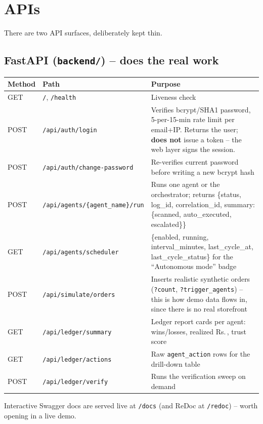 \documentclass[11pt,a4paper]{article}
\newcommand{\Rs}{Rs.\,}
\begin{document}
\section{APIs}

There are two API surfaces, deliberately kept thin.

\subsection{FastAPI (\texttt{backend/}) -- does the real work}
\begin{center}
\begin{tabular}{@{}p{1.2cm}p{4.6cm}p{6.8cm}@{}}
\toprule
\textbf{Method} & \textbf{Path} & \textbf{Purpose} \\
\midrule
GET & \texttt{/}, \texttt{/health} & Liveness check \\
POST & \texttt{/api/auth/login} & Verifies bcrypt/SHA1 password, 5-per-15-min rate limit per
email+IP. Returns the user; \textbf{does not} issue a token -- the web layer signs the session. \\
POST & \texttt{/api/auth/change-password} & Re-verifies current password before writing a new
bcrypt hash \\
POST & \texttt{/api/agents/\{agent\_name\}/run} & Runs one agent or the orchestrator; returns
\{status, log\_id, correlation\_id, summary: \{scanned, auto\_executed, escalated\}\} \\
GET & \texttt{/api/agents/scheduler} & \{enabled, running, interval\_minutes, last\_cycle\_at,
last\_cycle\_status\} for the ``Autonomous mode'' badge \\
POST & \texttt{/api/simulate/orders} & Inserts realistic synthetic orders (\texttt{?count},
\texttt{?trigger\_agents}) -- this is how demo data flows in, since there is no real storefront \\
GET & \texttt{/api/ledger/summary} & Ledger report cards per agent: wins/losses, realized
\Rs{}, trust score \\
GET & \texttt{/api/ledger/actions} & Raw \texttt{agent\_action} rows for the drill-down table \\
POST & \texttt{/api/ledger/verify} & Runs the verification sweep on demand \\
\bottomrule
\end{tabular}
\end{center}
Interactive Swagger docs are served live at \texttt{/docs} (and ReDoc at \texttt{/redoc}) --
worth opening in a live demo.
\end{document}

